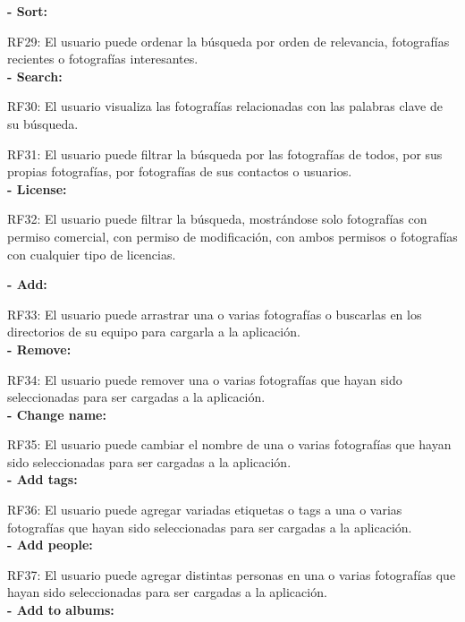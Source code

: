 \documentclass{memoria}
\begin{document}

\textbf{- Sort:} 

RF29: El usuario puede ordenar la búsqueda por orden de relevancia, fotografías recientes o fotografías interesantes.\\

\textbf{- Search:}

RF30: El usuario visualiza las fotografías relacionadas con las palabras clave de su búsqueda.

RF31: El usuario puede filtrar la búsqueda por las fotografías de todos, por sus propias fotografías, por fotografías de sus contactos o usuarios.\\

\textbf{- License:}

RF32: El usuario puede filtrar la búsqueda, mostrándose solo fotografías con permiso comercial, con permiso de modificación, con ambos permisos o fotografías con cualquier tipo de licencias.\\


\textbf{- Add:}

RF33: El usuario puede arrastrar una o varias fotografías o buscarlas en los directorios de su equipo para cargarla a la aplicación.\\

\textbf{- Remove:} 

RF34: El usuario puede remover una o varias fotografías que hayan sido seleccionadas para ser cargadas a la aplicación.\\ 

\textbf{- Change name:}

RF35: El usuario puede cambiar el nombre de una o varias fotografías que hayan sido seleccionadas para ser cargadas a la aplicación.\\

\textbf{- Add tags:}

RF36: El usuario puede agregar variadas etiquetas o tags a una o varias fotografías que hayan sido seleccionadas para ser cargadas a la aplicación.\\

\textbf{- Add people:}

RF37: El usuario puede agregar distintas personas en una o varias fotografías que hayan sido seleccionadas para ser cargadas a la aplicación.\\

\textbf{- Add to albums:}
\end{document}
